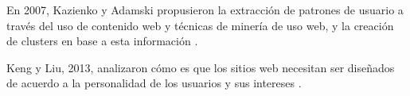 En 2007, Kazienko y Adamski propusieron la extracción de patrones de
usuario a través del uso de contenido web y técnicas de minería de uso
web, y la creación de clusters en base a esta información
\cite{kazienko2007adrosa}.


Keng y Liu, 2013, analizaron cómo es que los sitios web necesitan ser
diseñados de acuerdo a la personalidad de los usuarios y sus intereses
\cite{keng2013can}.














